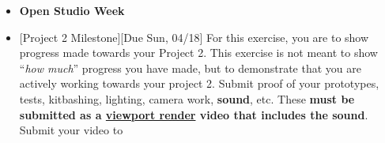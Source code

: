 \def\dMon{Mon, 04/12}
\def\dTues{Tues, 04/13}
\def\dWed{Wed, 04/14}
\def\dThur{Thur, 04/15}
\def\dFri{Fri, 04/16}
\def\dSat{Sat, 04/17}
\def\dSun{Sun, 04/18}
\placeDate

\begin{itemize}[noitemsep,topsep=0pt,leftmargin=*]
    \item \textcolor{defaultColor}{\textbf{Open Studio Week}}          
    \item {}[Project 2 Milestone][Due \dSun] For this exercise, you are to show progress made towards your Project 2. This exercise is not meant to show ``\emph{how much}'' progress you have made, but to demonstrate that you are actively working towards your project 2. Submit proof of your prototypes, tests, kitbashing, lighting, camera work, \textbf{sound}, etc. These \textbf{must be submitted as a \href{https://docs.blender.org/manual/en/latest/editors/3dview/viewport_render.html}{viewport render} video that includes the sound}. Submit your video to \discordE
\end{itemize}